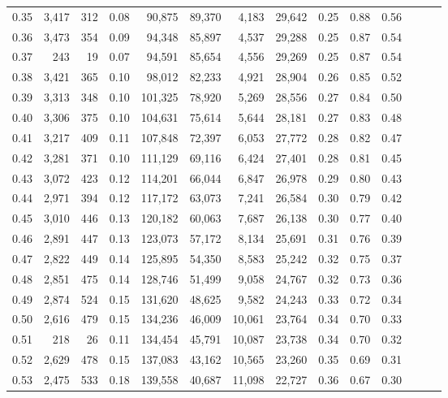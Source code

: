 \begin{tabular}{rrrrrrrrrrrrrr}
0.35 &  3,417 &  312 &  0.08 &   90,875 &   89,370 &   4,183 &  29,642 &  0.25 &  0.88 &      0.56 \\
0.36 &  3,473 &  354 &  0.09 &   94,348 &   85,897 &   4,537 &  29,288 &  0.25 &  0.87 &      0.54 \\
0.37 &    243 &   19 &  0.07 &   94,591 &   85,654 &   4,556 &  29,269 &  0.25 &  0.87 &      0.54 \\
0.38 &  3,421 &  365 &  0.10 &   98,012 &   82,233 &   4,921 &  28,904 &  0.26 &  0.85 &      0.52 \\
0.39 &  3,313 &  348 &  0.10 &  101,325 &   78,920 &   5,269 &  28,556 &  0.27 &  0.84 &      0.50 \\
0.40 &  3,306 &  375 &  0.10 &  104,631 &   75,614 &   5,644 &  28,181 &  0.27 &  0.83 &      0.48 \\
0.41 &  3,217 &  409 &  0.11 &  107,848 &   72,397 &   6,053 &  27,772 &  0.28 &  0.82 &      0.47 \\
0.42 &  3,281 &  371 &  0.10 &  111,129 &   69,116 &   6,424 &  27,401 &  0.28 &  0.81 &      0.45 \\
0.43 &  3,072 &  423 &  0.12 &  114,201 &   66,044 &   6,847 &  26,978 &  0.29 &  0.80 &      0.43 \\
0.44 &  2,971 &  394 &  0.12 &  117,172 &   63,073 &   7,241 &  26,584 &  0.30 &  0.79 &      0.42 \\
0.45 &  3,010 &  446 &  0.13 &  120,182 &   60,063 &   7,687 &  26,138 &  0.30 &  0.77 &      0.40 \\
0.46 &  2,891 &  447 &  0.13 &  123,073 &   57,172 &   8,134 &  25,691 &  0.31 &  0.76 &      0.39 \\
0.47 &  2,822 &  449 &  0.14 &  125,895 &   54,350 &   8,583 &  25,242 &  0.32 &  0.75 &      0.37 \\
0.48 &  2,851 &  475 &  0.14 &  128,746 &   51,499 &   9,058 &  24,767 &  0.32 &  0.73 &      0.36 \\
0.49 &  2,874 &  524 &  0.15 &  131,620 &   48,625 &   9,582 &  24,243 &  0.33 &  0.72 &      0.34 \\
0.50 &  2,616 &  479 &  0.15 &  134,236 &   46,009 &  10,061 &  23,764 &  0.34 &  0.70 &      0.33 \\
0.51 &    218 &   26 &  0.11 &  134,454 &   45,791 &  10,087 &  23,738 &  0.34 &  0.70 &      0.32 \\
0.52 &  2,629 &  478 &  0.15 &  137,083 &   43,162 &  10,565 &  23,260 &  0.35 &  0.69 &      0.31 \\
0.53 &  2,475 &  533 &  0.18 &  139,558 &   40,687 &  11,098 &  22,727 &  0.36 &  0.67 &      0.30 \\

\end{tabular}
